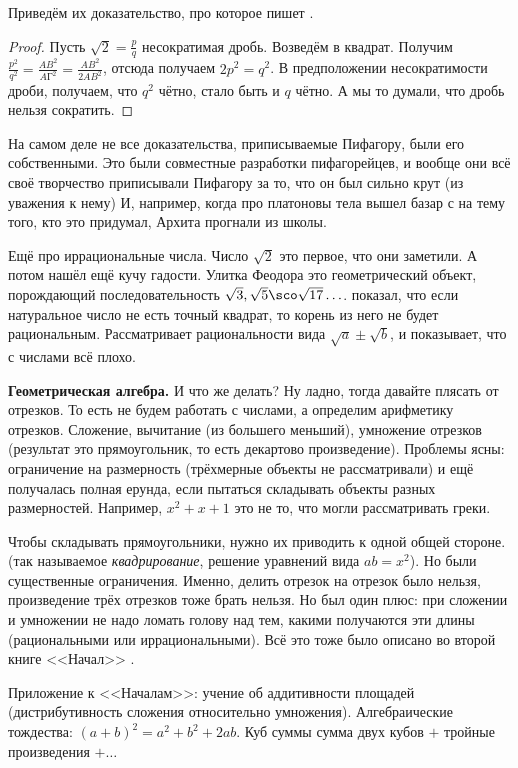 \documentclass[a4paper,oneside,fleqn,10pt]{article}
\begin{document}
Приведём их доказательство, про которое пишет .

\begin{proof}
Пусть $\sqrt2 = \frac{p}{q}$ несократимая дробь. Возведём в квадрат.
Получим $\frac{p^2}{q^2} = \frac{AB^2}{AГ^2} = \frac{AB^2}{2AB^2}$,
отсюда получаем $2p^2 = q^2$. В предположении несократимости дроби, получаем,
что $q^2$ чётно, стало быть и $q$ чётно. А мы то думали, что дробь нельзя сократить.
\end{proof}

На самом деле не все доказательства, приписываемые Пифагору, были его собственными.
Это были совместные разработки пифагорейцев, и вообще
они всё своё творчество приписывали Пифагору за то, что он был сильно крут (из уважения к нему)
И, например, когда про платоновы тела вышел базар с  на тему того, кто это придумал,
Архита прогнали из школы.

Ещё про иррациональные числа. Число $\sqrt2$ это первое, что они заметили.
А потом  нашёл ещё кучу гадости. Улитка Феодора это геометрический объект, порождающий
последовательность $\sqrt3, \sqrt5\sco\sqrt{17}\ldots$.
 показал, что если натуральное число не есть точный квадрат, то корень из него не будет рациональным.
Рассматривает рациональности вида $\sqrt a \pm \sqrt b$, и показывает, что с числами всё плохо.

\textbf{Геометрическая алгебра.}
И что же делать? Ну ладно, тогда давайте плясать от отрезков. То есть не будем работать с числами,
а определим арифметику отрезков.
Сложение, вычитание (из большего меньший), умножение отрезков (результат это прямоугольник,
то есть декартово произведение). Проблемы ясны: ограничение на размерность (трёхмерные объекты не
рассматривали) и ещё получалась полная ерунда, если пытаться складывать объекты разных
размерностей. Например, $x^2 + x + 1$ это не то, что могли рассматривать греки.

Чтобы складывать прямоугольники, нужно их приводить к одной общей стороне.
(так называемое \emph{квадрирование}, решение уравнений вида $ab = x^2$). Но были существенные ограничения.
Именно, делить отрезок на отрезок было нельзя,
произведение трёх отрезков тоже брать нельзя.
Но был один плюс: при сложении и умножении не надо ломать голову
над тем, какими получаются эти длины (рациональными или иррациональными).
Всё это тоже было описано во второй книге <<Начал>> .

Приложение к <<Началам>>: учение об аддитивности площадей (дистрибутивность сложения относительно умножения).
Алгебраические тождества: $(a+b)^2 = a^2 + b^2 + 2ab$. Куб суммы сумма двух кубов $+$ тройные произведения
$+\ldots$
\end{document}
